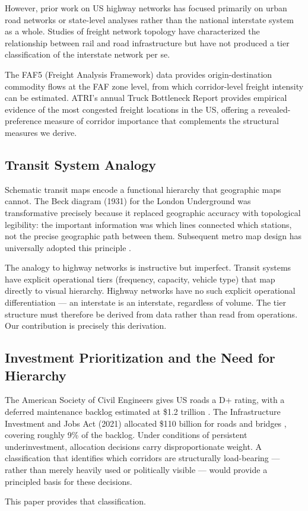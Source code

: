 However, prior work on US highway networks has focused primarily on urban road networks or state-level analyses rather than the national interstate system as a whole. Studies of freight network topology \citep{Bhatta2012} have characterized the relationship between rail and road infrastructure but have not produced a tier classification of the interstate network per se.

The FAF5 (Freight Analysis Framework) data \citep{FAF5_2022} provides origin-destination commodity flows at the FAF zone level, from which corridor-level freight intensity can be estimated. ATRI's annual Truck Bottleneck Report \citep{ATRI2024} provides empirical evidence of the most congested freight locations in the US, offering a revealed-preference measure of corridor importance that complements the structural measures we derive.

\subsection{Transit System Analogy}

Schematic transit maps encode a functional hierarchy that geographic maps cannot. The Beck diagram (1931) for the London Underground was transformative precisely because it replaced geographic accuracy with topological legibility: the important information was which lines connected which stations, not the precise geographic path between them. Subsequent metro map design has universally adopted this principle \citep{Vertesi2008}.

The analogy to highway networks is instructive but imperfect. Transit systems have explicit operational tiers (frequency, capacity, vehicle type) that map directly to visual hierarchy. Highway networks have no such explicit operational differentiation --- an interstate is an interstate, regardless of volume. The tier structure must therefore be derived from data rather than read from operations. Our contribution is precisely this derivation.

\subsection{Investment Prioritization and the Need for Hierarchy}

The American Society of Civil Engineers gives US roads a D+ rating, with a deferred maintenance backlog estimated at \$1.2 trillion \citep{ASCE2021}. The Infrastructure Investment and Jobs Act (2021) allocated \$110 billion for roads and bridges \citep{IIJA2021}, covering roughly 9\% of the backlog. Under conditions of persistent underinvestment, allocation decisions carry disproportionate weight. A classification that identifies which corridors are structurally load-bearing --- rather than merely heavily used or politically visible --- would provide a principled basis for these decisions.

This paper provides that classification.
